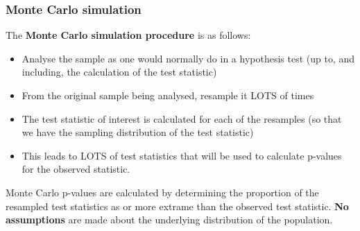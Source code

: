 \documentclass[a4paper]{article}
\begin{document}
\subsubsection{Monte Carlo simulation}
The \textbf{Monte Carlo simulation procedure} is as follows:
\begin{itemize}
	\item Analyse the sample as one would normally do in a hypothesis test (up to, and including, the calculation of the test statistic)
	\item From the original sample being analysed, resample it LOTS of times
	\item The test statistic of interest is calculated for each of the resamples (so that we have the sampling distribution of the test statistic)
	\item This leads to LOTS of test statistics that will be used to calculate p-values for the observed statistic.
\end{itemize}
Monte Carlo p-values are calculated by determining the proportion of the resampled test statistics as or more extrame than the observed test statistic.
\textbf{No assumptions} are made about the underlying distribution of the population.
\end{document}
